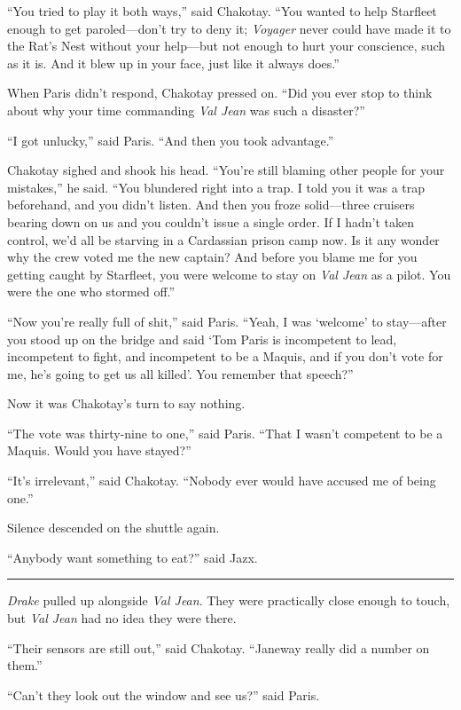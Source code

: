 \documentclass[twoside,letterpaper,12pt]{memoir}
\begin{document}
``You tried to play it both ways,'' said Chakotay. ``You wanted to help Starfleet enough to get paroled---don't try to deny it; \textit{Voyager} never could have made it to the Rat's Nest without your help---but not enough to hurt your conscience, such as it is. And it blew up in your face, just like it always does.''

When Paris didn't respond, Chakotay pressed on. ``Did you ever stop to think about why your time commanding \textit{Val Jean} was such a disaster?''

``I got unlucky,'' said Paris. ``And then you took advantage.''

Chakotay sighed and shook his head. ``You're still blaming other people for your mistakes,'' he said. ``You blundered right into a trap. I told you it was a trap beforehand, and you didn't listen. And then you froze solid---three cruisers bearing down on us and you couldn't issue a single order. If I hadn't taken control, we'd all be starving in a Cardassian prison camp now. Is it any wonder why the crew voted me the new captain? And before you blame me for you getting caught by Starfleet, you were welcome to stay on \textit{Val Jean} as a pilot. You were the one who stormed off.''

``Now you're really full of shit,'' said Paris. ``Yeah, I was `welcome' to stay---after you stood up on the bridge and said `Tom Paris is incompetent to lead, incompetent to fight, and incompetent to be a Maquis, and if you don't vote for me, he's going to get us all killed'. You remember that speech?''

Now it was Chakotay's turn to say nothing.

``The vote was thirty-nine to one,'' said Paris. ``That I wasn't competent to be a Maquis. Would you have stayed?''

``It's irrelevant,'' said Chakotay. ``Nobody ever would have accused me of being one.''

Silence descended on the shuttle again.

``Anybody want something to eat?'' said Jazx.

\fancybreak{\rule{3cm}{0.4 pt}}
\textit{Drake} pulled up alongside \textit{Val Jean}. They were practically close enough to touch, but \textit{Val Jean} had no idea they were there.

``Their sensors are still out,'' said Chakotay. ``Janeway really did a number on them.''

``Can't they look out the window and see us?'' said Paris.
\end{document}
